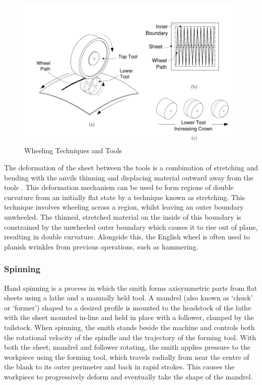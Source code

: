 \begin{figure}[h]
    \centering
    \includegraphics[width=0.8\linewidth]{Images/WheelingTechDrawing.pdf}
    \caption{Wheeling Techniques and Tools}
    \label{fig:WheelingTech}
\end{figure}


The deformation of the sheet between the tools is a combination of stretching and bending with the anvils thinning and displacing material outward away from the tools \citep{Bowen2021NumericalProcess}.  This deformation mechanism can be used to form regions of double curvature from an initially flat state by a technique known as stretching. This technique involves wheeling across a region, whilst leaving an outer boundary unwheeled. The thinned, stretched material on the inside of this boundary is constrained by the unwheeled outer boundary which causes it to rise out of plane, resulting in double curvature. Alongside this, the English wheel is often used to planish wrinkles from previous operations, such as hammering.

\subsubsection{Spinning} \label{sec:ManualSpinning}
Hand spinning is a process in which the smith forms axisymmetric parts from flat sheets using a lathe and a manually held tool. A mandrel (also known as `chuck’ or `former’) shaped to a desired profile is mounted to the headstock of the lathe with the sheet mounted in-line and held in place with a follower, clamped by the tailstock. When spinning, the smith stands beside the machine and controls both the rotational velocity of the spindle and the trajectory of the forming tool. With both the sheet, mandrel and follower rotating, the smith applies pressure to the workpiece using the forming tool, which travels radially from near the centre of the blank to its outer perimeter and back in rapid strokes. This causes the workpiece to progressively deform and eventually take the shape of the mandrel.

